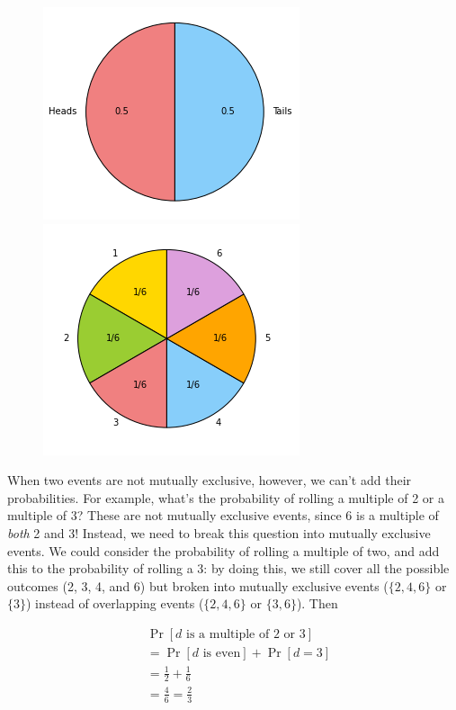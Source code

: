 \begin{figure}[h]
    \includegraphics[width=.5\linewidth]{imgs/coin-pie.png}
    \includegraphics[width=.5\linewidth]{imgs/die-pie.png}
    \label{fig:pies}
  \end{figure}

When two events are not mutually exclusive, however, we can't add 
their probabilities. For example, what's the probability of rolling a 
multiple of 2 or a multiple of 3? These are not mutually exclusive
events, since 6 is a multiple of \emph{both} 2 and 3! Instead, we need 
to break this question into mutually exclusive events. We could consider 
the probability of rolling a multiple of two, and add this to the 
probability of rolling a 3: by doing this, we still cover all the 
possible outcomes (2, 3, 4, and 6) but broken into mutually exclusive 
events ($\{2,4,6\}$ or $\{3\}$) instead of overlapping events ($\{2, 4, 
6\}$ or $\{3, 6\}$). Then

\begin{align*}
    &\Pr[d \text{ is a multiple of 2 or 3}] \\
    &= \Pr[d \text{ is even}] + \Pr[d=3]\\
    &= \frac{1}{2} + \frac{1}{6}\\
    &= \frac{4}{6} = \frac{2}{3}
\end{align*}

